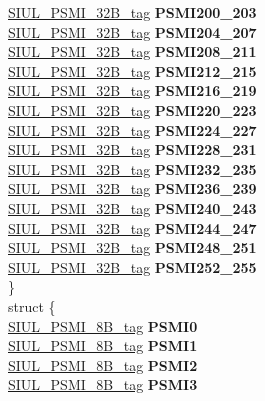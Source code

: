 \begin{DoxyCompactItemize}
\begin{tabbing}
\>\>\mbox{\hyperlink{unionSIUL__PSMI__32B__tag}{SIUL\_PSMI\_32B\_tag}} {\bfseries PSMI200\_203}\\
\>\>\mbox{\hyperlink{unionSIUL__PSMI__32B__tag}{SIUL\_PSMI\_32B\_tag}} {\bfseries PSMI204\_207}\\
\>\>\mbox{\hyperlink{unionSIUL__PSMI__32B__tag}{SIUL\_PSMI\_32B\_tag}} {\bfseries PSMI208\_211}\\
\>\>\mbox{\hyperlink{unionSIUL__PSMI__32B__tag}{SIUL\_PSMI\_32B\_tag}} {\bfseries PSMI212\_215}\\
\>\>\mbox{\hyperlink{unionSIUL__PSMI__32B__tag}{SIUL\_PSMI\_32B\_tag}} {\bfseries PSMI216\_219}\\
\>\>\mbox{\hyperlink{unionSIUL__PSMI__32B__tag}{SIUL\_PSMI\_32B\_tag}} {\bfseries PSMI220\_223}\\
\>\>\mbox{\hyperlink{unionSIUL__PSMI__32B__tag}{SIUL\_PSMI\_32B\_tag}} {\bfseries PSMI224\_227}\\
\>\>\mbox{\hyperlink{unionSIUL__PSMI__32B__tag}{SIUL\_PSMI\_32B\_tag}} {\bfseries PSMI228\_231}\\
\>\>\mbox{\hyperlink{unionSIUL__PSMI__32B__tag}{SIUL\_PSMI\_32B\_tag}} {\bfseries PSMI232\_235}\\
\>\>\mbox{\hyperlink{unionSIUL__PSMI__32B__tag}{SIUL\_PSMI\_32B\_tag}} {\bfseries PSMI236\_239}\\
\>\>\mbox{\hyperlink{unionSIUL__PSMI__32B__tag}{SIUL\_PSMI\_32B\_tag}} {\bfseries PSMI240\_243}\\
\>\>\mbox{\hyperlink{unionSIUL__PSMI__32B__tag}{SIUL\_PSMI\_32B\_tag}} {\bfseries PSMI244\_247}\\
\>\>\mbox{\hyperlink{unionSIUL__PSMI__32B__tag}{SIUL\_PSMI\_32B\_tag}} {\bfseries PSMI248\_251}\\
\>\>\mbox{\hyperlink{unionSIUL__PSMI__32B__tag}{SIUL\_PSMI\_32B\_tag}} {\bfseries PSMI252\_255}\\
\>\} \\
\mbox{\label{unionSIU__tag_1_1_0D1540_a0b8610d82c785ef72a5c7537d99d0c80}} 
\>struct \{\\
\>\>\mbox{\hyperlink{unionSIUL__PSMI__8B__tag}{SIUL\_PSMI\_8B\_tag}} {\bfseries PSMI0}\\
\>\>\mbox{\hyperlink{unionSIUL__PSMI__8B__tag}{SIUL\_PSMI\_8B\_tag}} {\bfseries PSMI1}\\
\>\>\mbox{\hyperlink{unionSIUL__PSMI__8B__tag}{SIUL\_PSMI\_8B\_tag}} {\bfseries PSMI2}\\
\>\>\mbox{\hyperlink{unionSIUL__PSMI__8B__tag}{SIUL\_PSMI\_8B\_tag}} {\bfseries PSMI3}\\

\end{tabbing}
\end{DoxyCompactItemize}
